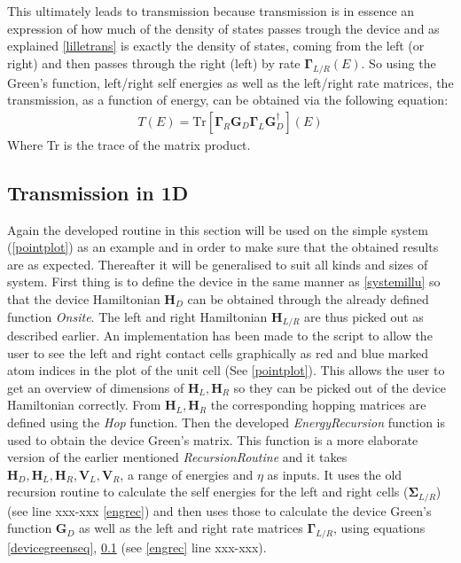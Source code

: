 This ultimately leads to transmission because transmission is in essence an expression of how much of the density of states passes trough the device and as explained \cref{lilletrans} is exactly the density of states, coming from the left (or right) and then passes through the right (left) by rate \(\mathbf{\Gamma}_{L/R}(E)\). So using the Green's function, left/right self energies as well as the left/right rate matrices, the transmission, as a function of energy, can be obtained via the following equation:
\begin{align}
    T(E) = \text{Tr}[\mathbf{\Gamma}_R\mathbf{G}_D\mathbf{\Gamma}_L\mathbf{G}_D^{\dagger}](E)
    \label{transeq}
\end{align}
Where Tr is the trace of the matrix product. 

\subsection{Transmission in 1D}
Again the developed routine in this section will be used on the simple system (\cref{pointplot}) as an example and in order to make sure that the obtained results are as expected. Thereafter it will be generalised to suit all kinds and sizes of system. First thing is to define the device in the same manner as \cref{systemillu} so that the device Hamiltonian \(\textbf{H}_D\) can be obtained through the already defined function \textit{Onsite}. The left and right Hamiltonian \(\textbf{H}_{L/R}\) are thus picked out as described earlier. An implementation has been made to the script to allow the user to see the left and right contact cells graphically as red and blue marked atom indices in the plot of the unit cell (See \cref{pointplot}).
This allows the user to get an overview of dimensions of \(\mathbf{H}_L,\mathbf{H}_R\) so they can be picked out of the device Hamiltonian correctly. From \(\mathbf{H}_L,\mathbf{H}_R\) the corresponding hopping matrices are defined using the \textit{Hop} function. Then the developed \textit{EnergyRecursion} function is used to obtain the device Green's matrix. This function is a more elaborate version of the earlier mentioned \textit{RecursionRoutine} and it takes \(\mathbf{H}_D,\mathbf{H}_L,\mathbf{H}_R,\mathbf{V}_L,\mathbf{V}_R\), a range of energies and \(\eta\) as inputs. It uses the old recursion routine to calculate the self energies for the left and right cells (\(\mathbf{\Sigma}_{L/R}\)) (see line xxx-xxx \cref{engrec}) and then uses those to calculate the device Green's function \(\textbf{G}_D\) as well as the left and right rate matrices \(\mathbf{\Gamma}_{L/R}\), using equations \cref{devicegreenseq}, \cref{} (see \cref{engrec} line xxx-xxx).
